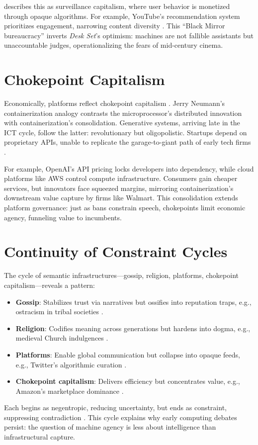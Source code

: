 \documentclass[a4paper,12pt]{article}
\begin{document}
\citet{zuboff2019surveillance} describes this as surveillance capitalism, where user behavior is monetized through opaque algorithms. For example, YouTube’s recommendation system prioritizes engagement, narrowing content diversity \citep{ribeiro2020auditing}. This ``Black Mirror bureaucracy'' inverts \emph{Desk Set}’s optimism: machines are not fallible assistants but unaccountable judges, operationalizing the fears of mid-century cinema.

\section{Chokepoint Capitalism}
Economically, platforms reflect chokepoint capitalism \citep{giblin2022chokepoint}. Jerry Neumann’s containerization analogy \citep{neumann2025ai} contrasts the microprocessor’s distributed innovation with containerization’s consolidation. Generative systems, arriving late in the ICT cycle, follow the latter: revolutionary but oligopolistic. Startups depend on proprietary APIs, unable to replicate the garage-to-giant path of early tech firms \citep{perez2002technological}. 

For example, OpenAI’s API pricing locks developers into dependency, while cloud platforms like AWS control compute infrastructure. Consumers gain cheaper services, but innovators face squeezed margins, mirroring containerization’s downstream value capture by firms like Walmart. This consolidation extends platform governance: just as bans constrain speech, chokepoints limit economic agency, funneling value to incumbents.

\section{Continuity of Constraint Cycles}
The cycle of semantic infrastructures—gossip, religion, platforms, chokepoint capitalism—reveals a pattern:
\begin{itemize}
    \item \textbf{Gossip}: Stabilizes trust via narratives but ossifies into reputation traps, e.g., ostracism in tribal societies \citep{dunbar1996gossip}.
    \item \textbf{Religion}: Codifies meaning across generations but hardens into dogma, e.g., medieval Church indulgences \citep{huizinga1919waning}.
    \item \textbf{Platforms}: Enable global communication but collapse into opaque feeds, e.g., Twitter’s algorithmic curation \citep{gillespie2018custodians}.
    \item \textbf{Chokepoint capitalism}: Delivers efficiency but concentrates value, e.g., Amazon’s marketplace dominance \citep{giblin2022chokepoint}.
\end{itemize}
Each begins as negentropic, reducing uncertainty, but ends as constraint, suppressing contradiction \citep{schumpeter1942capitalism}. This cycle explains why early computing debates persist: the question of machine agency is less about intelligence than infrastructural capture.
\end{document}
